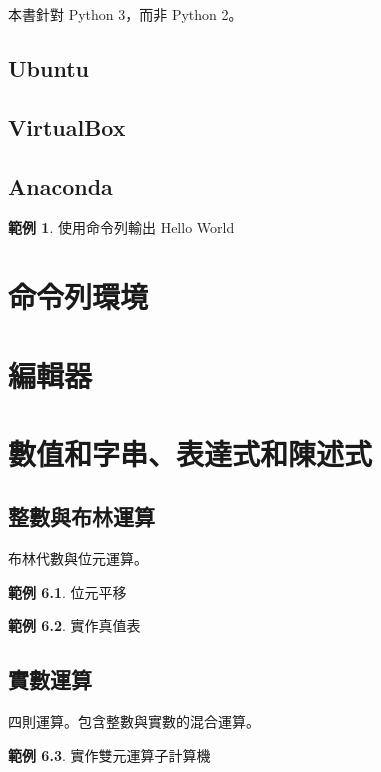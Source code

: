 \documentclass[a4paper,12pt]{book}
\theoremstyle{definition}
\newtheorem{example}{範例}[chapter]
\begin{document}
本書針對 Python 3，而非 Python 2。

\section{Ubuntu}

\section{VirtualBox}

\section{Anaconda}

\begin{example}
使用命令列輸出 Hello World
\end{example}

\chapter{命令列環境}

\chapter{編輯器}

\chapter{數值和字串、表達式和陳述式}

\section{整數與布林運算}

布林代數與位元運算。

\begin{example}
位元平移
\end{example}

\begin{example}
實作真值表
\end{example}

\section{實數運算}

四則運算。包含整數與實數的混合運算。

\begin{example}
實作雙元運算子計算機
\end{example}
\end{document}
